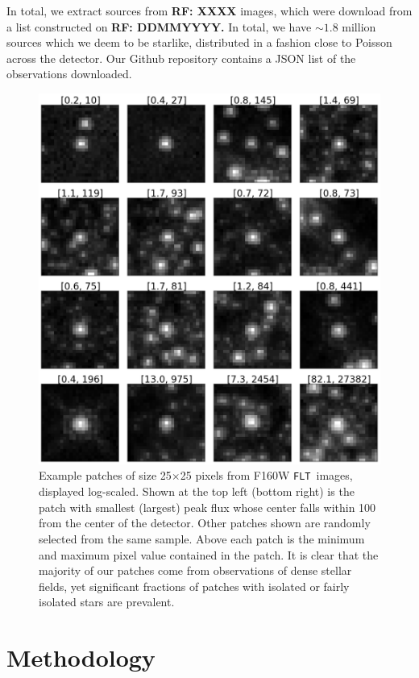 \documentclass[12pt,letterpaper,preprint]{aastex}
\newcommand{\rf}[1]{\textbf{RF: #1}}
\newcommand{\FLT}{\texttt{FLT}}
\begin{document}
In total, we extract sources from \rf{XXXX} images, which were download from a list constructed on 
\rf{DDMMYYYY.}  In total, we have $\sim1.8$ million sources which we deem to be starlike, distributed 
in a fashion close to Poisson across the detector.  Our Github repository contains a JSON list of the
observations downloaded.

\begin{figure}
\centering
 \includegraphics[clip=true, trim=0cm 0cm 0.0cm 0.cm,width=12cm]{../../plots/paper/fig1.png}
\caption{Example patches of size 25$\times$25 pixels from F160W \FLT\, images, displayed log-scaled.
Shown at the top left (bottom right) is the patch with smallest (largest) peak flux whose center falls within
100 from the center of the detector.  Other patches shown are randomly selected from the same sample.
Above each patch is the minimum and maximum pixel value contained in the patch.
It is clear that the majority of our patches come from observations of dense stellar fields, yet significant 
fractions of patches with isolated or fairly isolated stars are prevalent.}
\label{fig:data-examples}
\end{figure}



\section{Methodology}
\end{document}
